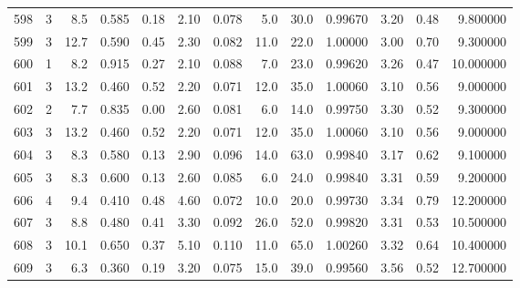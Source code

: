 \begin{tabular}{lrrrrrrrrrrrr}
598  &        3 &            8.5 &             0.585 &         0.18 &            2.10 &      0.078 &                  5.0 &                  30.0 &  0.99670 &  3.20 &       0.48 &   9.800000 \\
599  &        3 &           12.7 &             0.590 &         0.45 &            2.30 &      0.082 &                 11.0 &                  22.0 &  1.00000 &  3.00 &       0.70 &   9.300000 \\
600  &        1 &            8.2 &             0.915 &         0.27 &            2.10 &      0.088 &                  7.0 &                  23.0 &  0.99620 &  3.26 &       0.47 &  10.000000 \\
601  &        3 &           13.2 &             0.460 &         0.52 &            2.20 &      0.071 &                 12.0 &                  35.0 &  1.00060 &  3.10 &       0.56 &   9.000000 \\
602  &        2 &            7.7 &             0.835 &         0.00 &            2.60 &      0.081 &                  6.0 &                  14.0 &  0.99750 &  3.30 &       0.52 &   9.300000 \\
603  &        3 &           13.2 &             0.460 &         0.52 &            2.20 &      0.071 &                 12.0 &                  35.0 &  1.00060 &  3.10 &       0.56 &   9.000000 \\
604  &        3 &            8.3 &             0.580 &         0.13 &            2.90 &      0.096 &                 14.0 &                  63.0 &  0.99840 &  3.17 &       0.62 &   9.100000 \\
605  &        3 &            8.3 &             0.600 &         0.13 &            2.60 &      0.085 &                  6.0 &                  24.0 &  0.99840 &  3.31 &       0.59 &   9.200000 \\
606  &        4 &            9.4 &             0.410 &         0.48 &            4.60 &      0.072 &                 10.0 &                  20.0 &  0.99730 &  3.34 &       0.79 &  12.200000 \\
607  &        3 &            8.8 &             0.480 &         0.41 &            3.30 &      0.092 &                 26.0 &                  52.0 &  0.99820 &  3.31 &       0.53 &  10.500000 \\
608  &        3 &           10.1 &             0.650 &         0.37 &            5.10 &      0.110 &                 11.0 &                  65.0 &  1.00260 &  3.32 &       0.64 &  10.400000 \\
609  &        3 &            6.3 &             0.360 &         0.19 &            3.20 &      0.075 &                 15.0 &                  39.0 &  0.99560 &  3.56 &       0.52 &  12.700000 \\

\end{tabular}
